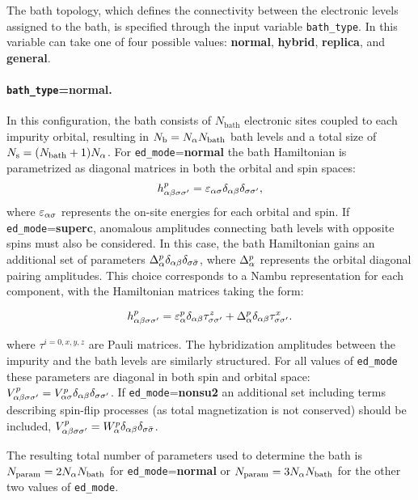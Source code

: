 \documentclass[edipack_sp.tex]{subfiles}
\begin{document}
The bath topology, which defines the connectivity between the
electronic levels assigned to the bath, is specified
through the input variable {\tt bath\_type}. 
In \NAME this variable can take one of four possible values: 
{\bf normal}, {\bf hybrid}, {\bf replica}, and {\bf general}.


\paragraph{{\tt bath\_type}={\bf normal}.} In this configuration, the
bath consists of $N_\mathrm{bath}$
electronic sites coupled to each impurity orbital, resulting
in $N_\mathrm{b} = N_\alpha N_\mathrm{bath}$ bath levels and a total size of $N_\mathrm{s}=(N_\mathrm{bath}+1)N_\alpha$.
For {\tt ed\_mode}={\bf normal} the bath Hamiltonian is parametrized as diagonal matrices in both the orbital and spin spaces:
$$
h^p_{\alpha\beta\sigma\sigma'}=\varepsilon_{\alpha\sigma}\delta_{\alpha\beta}\delta_{\sigma\sigma'},
$$
where $\varepsilon_{\alpha\sigma}$ represents  the on-site energies for each orbital and spin. 
%
If {\tt ed\_mode}={\bf superc},  anomalous
amplitudes connecting bath levels with opposite spins must also be
considered. In this case, the bath Hamiltonian gains 
an additional set of parameters $\Delta^p_{\alpha}\delta_{\alpha\beta}\delta_{\sigma \bar{\sigma}}$, where $\Delta^p_\alpha$ represents the orbital diagonal pairing amplitudes. 
This choice corresponds to a Nambu representation for each component, with the Hamiltonian matrices taking the form:

$$
h_{\alpha\beta\sigma\sigma'}^p = \varepsilon_\alpha^p\delta_{\alpha\beta}\tau^z_{\sigma\sigma'} + \Delta^p_\alpha\delta_{\alpha\beta}\tau^x_{\sigma\sigma'} .
$$

where $\tau^{i=0,x,y,z}$ are Pauli matrices.
%
The hybridization amplitudes between the impurity and the bath levels
are similarly structured. For all values of {\tt ed\_mode} these
parameters are diagonal in both
spin and orbital space: $V^p_{\alpha\beta\sigma\sigma'}=V^p_{\alpha\sigma}\delta_{\alpha\beta}\delta_{\sigma\sigma'}$.
%
If {\tt ed\_mode}={\bf nonsu2}  an additional set including terms describing spin-flip processes (as total magnetization is not conserved) should be included, $V^p_{\alpha\beta\sigma\sigma'} =
W^p_{\alpha}\delta_{\alpha\beta}\delta_{\sigma \bar{\sigma}}$. 
%

The resulting total number of parameters used to determine the bath is $N_\mathrm{param}=2N_\alpha N_\mathrm{bath}$ for {\tt ed\_mode}={\bf normal} or $N_\mathrm{param}=3N_\alpha N_\mathrm{bath}$ for the other two values of {\tt ed\_mode}.
\end{document}
